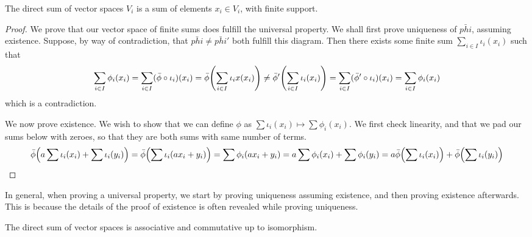 \begin{theorem}
    The direct sum of vector spaces \(V_i\)
    is a sum of elements \(x_i \in V_i\), with finite support.
\end{theorem}
\begin{proof}
    We prove that our vector space of finite sums does fulfill the universal property.
    We shall first prove uniqueness of \(\bar{phi}\), assuming existence.
    Suppose, by way of contradiction,
    that \(\bar{phi} \neq \bar{phi}'\) both fulfill this diagram.
    Then there exists some finite sum \(\sum_{i \in I} \iota_i(x_i)\) such that
    \begin{equation*}
        \sum_{i \in I} \phi_i(x_i)
        = \sum_{i \in I} (\bar{\phi}\circ\iota_i)(x_i)
        = \bar{\phi}\pqty{\sum_{i \in I} \iota_ix(x_i)}
        \neq \bar{\phi}'\pqty{\sum_{i \in I} \iota_i(x_i)}
        = \sum_{i \in I} (\bar{\phi}'\circ\iota_i)(x_i)
        = \sum_{i \in I} \phi_i(x_i)
    \end{equation*}
    which is a contradiction.

    We now prove existence.
    We wish to show that we can define \(\phi\) as
    \(\sum \iota_i(x_i) \mapsto \sum \phi_i(x_i)\).
    We first check linearity,
    and that we pad our sums below with zeroes,
    so that they are both sums with same number of terms.
    \begin{equation*}
        \bar{\phi}\pqty{a\sum \iota_i(x_i) + \sum \iota_i(y_i)}
        = \bar{\phi}\pqty{\sum \iota_i(ax_i + y_i)}
        = \sum \phi_i(ax_i + y_i)
        = a\sum \phi_i(x_i) + \sum \phi_i(y_i)
        = a\bar{\phi}\pqty{\sum \iota_i(x_i)} + \bar{\phi}\pqty{\sum \iota_i(y_i)}
    \end{equation*}
\end{proof}
\begin{remark}
    In general, when proving a universal property,
    we start by proving uniqueness assuming existence,
    and then proving existence afterwards.
    This is because the details of the proof of existence
    is often revealed while proving uniqueness.
\end{remark}
\begin{theorem}
    The direct sum of vector spaces is associative and commutative up to isomorphism.
\end{theorem}
